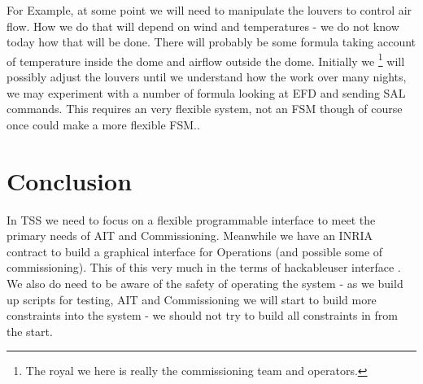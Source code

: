 For Example, at some point we will need to manipulate the louvers to control air flow.
 How we do that will depend on wind and temperatures - we do not know today how that will be done.
There will probably be some formula taking account of temperature inside the dome and airflow outside the dome.
Initially  we \footnote{The royal we here is really the commissioning team and operators.} will possibly adjust the louvers until we understand how the work over many nights, we may experiment with a number of formula looking at EFD and sending SAL commands.
 This requires an very flexible system,  not an FSM though of course once could make a more flexible FSM..

\section{Conclusion}
In TSS we need to focus on a flexible programmable interface to meet the  primary needs of AIT and Commissioning.
Meanwhile we have an INRIA contract to build a graphical interface for Operations (and possible some of commissioning).
This of this very much in the terms of hackableuser interface \citep{2015ASPC..495..101B}.
We also do need to be aware of the safety of operating the system - as we build up scripts for testing, AIT and Commissioning we will start to build more constraints into the system - we should not try to build all constraints in from the start.


